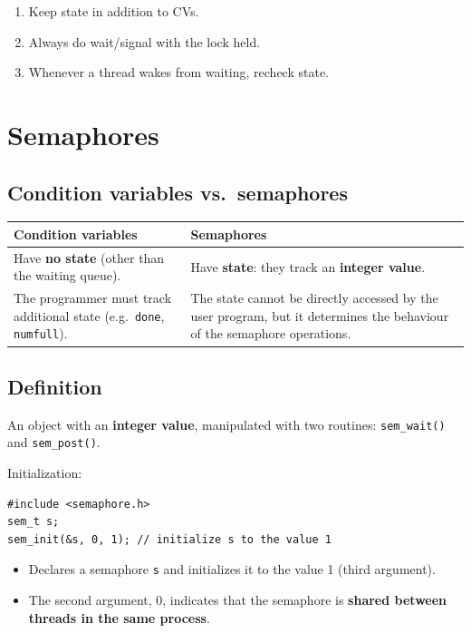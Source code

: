\documentclass[11pt,a4paper]{article}
\begin{document}
\begin{keybox}
\begin{enumerate}
  \item Keep state in addition to CVs.
  \item Always do wait/signal with the lock held.
  \item Whenever a thread wakes from waiting, recheck state.
\end{enumerate}
\end{keybox}

\section{Semaphores}

\subsection{Condition variables vs.\ semaphores}

\begin{center}
\renewcommand{\arraystretch}{1.25}
\begin{tabularx}{\textwidth}{@{}XX@{}}
  \toprule
  \textbf{Condition variables} & \textbf{Semaphores} \\
  \midrule
  Have \textbf{no state} (other than the waiting queue). &
  Have \textbf{state}: they track an \textbf{integer value}. \\
  The programmer must track additional state (e.g.\ \texttt{done},
  \texttt{numfull}). &
  The state cannot be directly accessed by the user program, but it
  determines the behaviour of the semaphore operations. \\
  \bottomrule
\end{tabularx}
\end{center}

\subsection{Definition}

\begin{defbox}[Semaphore]
An object with an \textbf{integer value}, manipulated with two routines:
\texttt{sem\_wait()} and \texttt{sem\_post()}.
\end{defbox}

Initialization:
\begin{lstlisting}
#include <semaphore.h>
sem_t s;
sem_init(&s, 0, 1); // initialize s to the value 1
\end{lstlisting}
\begin{itemize}
  \item Declares a semaphore \texttt{s} and initializes it to the value 1
        (third argument).
  \item The second argument, 0, indicates that the semaphore is
        \textbf{shared between threads in the same process}.
\end{itemize}
\end{document}
